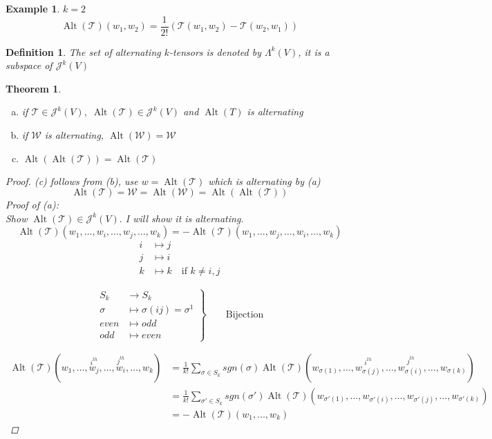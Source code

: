 \documentclass[12pt]{article}
\def\maw{\mathcal{W}}
\def\mat{\mathcal{T}}
\DeclareMathOperator{\alt}{Alt}
\newtheorem{theorem}{Theorem}[section]
\newtheorem{definition}{Definition}[section]
\newtheorem{example}{Example}[section]
\begin{document}
\begin{example}
$k=2$
\[\alt(\mathcal{T})(w_1 , w_2) = \frac{1}{2!}(\mat(w_1, w_2) - \mat(w_2, w_1))\]
\end{example}

\begin{definition}
The set of alternating $k$-tensors is denoted by $\Lambda^k(V)$, it is a subspace of $\mathcal{J}^k(V)$ 
\end{definition}

\begin{theorem}\quad\\
\begin{enumerate}[(a)]
\item if $\mat \in \mathcal{J}^k(V), \; \alt(\mat) \in \mathcal{J}^k(V)$ and $\alt(T)$ is alternating
\item if $\mathcal{W}$ is alternating, $\alt(\mathcal{W}) = \mathcal{W}$
\item $\alt(\alt(\mat)) = \alt(\mat)$
\end{enumerate}
\begin{proof}
(c) follows from (b), use $w=\alt(\mat)$ which is alternating by (a)
\[\alt(\mat) = \maw = \alt(\maw) = \alt(\alt(\mat))\]
Proof of (a):\\
Show $\alt(\mat) \in \mathcal{J}^k(V).$ I will show it is alternating.
\[\alt(\mat)(w_1, \dots, w_i, \dots , w_j , \dots , w_k) = -\alt(\mat)(w_1, \dots , w_j,\dots, w_i , \dots , w_k)\]
\begin{align*}
i &\mapsto j  \\
j &\mapsto i\\
k &\mapsto k \quad \text{if }k\neq i,j \end{align*}

\begin{equation}
 \left.\begin{aligned}
       S_k &\rightarrow S_k \\
        \sigma &\mapsto \sigma(ij) = \sigma^{1} \\
even &\mapsto odd\\
odd &\mapsto  even 
       \end{aligned}
 \right\}
 \qquad \text{Bijection}
\end{equation}

\begin{align*}
\alt(\mat)(w_1, \dots , \overset{i^{th}}{w_j} , \dots , \overset{j^{th}}{w_i} , \dots , w_k) &= \frac{1}{k!}\sum\limits_{\sigma \in S_k}sgn(\sigma)\alt(\mat)(w_{\sigma(1)}, \dots , \overset{i^{th}}{w_{\sigma(j)}} , \dots , \overset{j^{th}}{w_{\sigma(i)}} , \dots , w_{\sigma(k)}) \\
&=  \frac{1}{k!}\sum\limits_{\sigma' \in S_k}sgn(\sigma')\alt(\mat)(w_{\sigma'(1)}, \dots , w_{\sigma'(i)} , \dots , w_{\sigma'(j)} , \dots , w_{\sigma'(k)})\\
&= -\alt(\mat)(w_1, \dots , w_k) \end{align*}


\end{proof}
\end{theorem}
\end{document}
